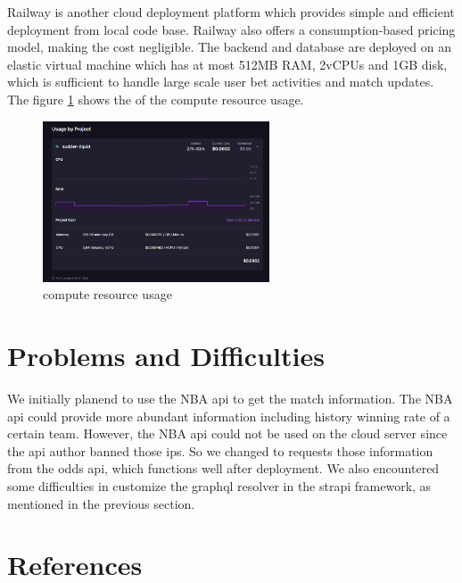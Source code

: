\documentclass[singlecolumn]{article}
\begin{document}
Railway is another cloud deployment platform which provides simple and efficient deployment from local code base. Railway also offers a consumption-based pricing model, making the cost negligible. The backend and database are deployed on an elastic virtual machine which has at most 512MB RAM, 2vCPUs and 1GB disk, which is sufficient to handle large scale user bet activities and match updates. The figure \ref{fig:resource} shows the of the compute resource usage.



\begin{figure}[H]
    \centering
    \includegraphics[width=0.6\textwidth]{resource.png}
    \caption{compute resource usage}
    \label{fig:resource}
\end{figure}

\section{Problems and Difficulties}

We initially planend to use the NBA api to get the match information. The NBA api could provide more abundant information including history winning rate of a certain team. However, the NBA api could not be used on the cloud server since the api author banned those ips. So we changed to requests those information from the odds api, which functions well after deployment. We also encountered some difficulties
in customize the graphql resolver in the strapi framework, as mentioned in the previous section. 

\section{References}
\end{document}
